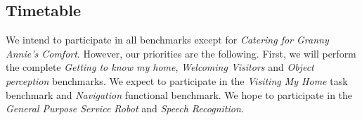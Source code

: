 


\subsection{Timetable}

We intend to participate in all benchmarks except for \textit{Catering for Granny Annie's Comfort}. However, our priorities are the following.
First, we will perform the complete \textit{Getting to know my home}, \textit{Welcoming Visitors} and \textit{Object perception} benchmarks.
We expect to participate in the \textit{Visiting My Home} task benchmark and \textit{Navigation} functional benchmark. We hope to participate in the \textit{General Purpose Service Robot} and \textit{Speech Recognition}.


